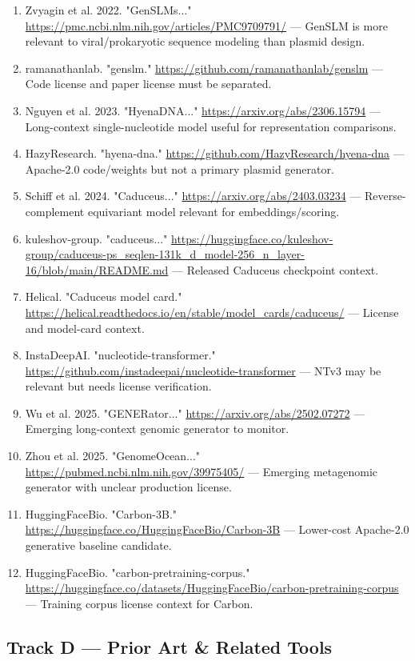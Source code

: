 \documentclass[11pt]{report}
\begin{document}
\begin{enumerate}
\item Zvyagin et al. 2022. "GenSLMs..." \url{https://pmc.ncbi.nlm.nih.gov/articles/PMC9709791/} — GenSLM is more relevant to viral/prokaryotic sequence modeling than plasmid design.
\item ramanathanlab. "genslm." \url{https://github.com/ramanathanlab/genslm} — Code license and paper license must be separated.
\item Nguyen et al. 2023. "HyenaDNA..." \url{https://arxiv.org/abs/2306.15794} — Long-context single-nucleotide model useful for representation comparisons.
\item HazyResearch. "hyena-dna." \url{https://github.com/HazyResearch/hyena-dna} — Apache-2.0 code/weights but not a primary plasmid generator.
\item Schiff et al. 2024. "Caduceus..." \url{https://arxiv.org/abs/2403.03234} — Reverse-complement equivariant model relevant for embeddings/scoring.
\item kuleshov-group. "caduceus..." \url{https://huggingface.co/kuleshov-group/caduceus-ps_seqlen-131k_d_model-256_n_layer-16/blob/main/README.md} — Released Caduceus checkpoint context.
\item Helical. "Caduceus model card." \url{https://helical.readthedocs.io/en/stable/model_cards/caduceus/} — License and model-card context.
\item InstaDeepAI. "nucleotide-transformer." \url{https://github.com/instadeepai/nucleotide-transformer} — NTv3 may be relevant but needs license verification.
\item Wu et al. 2025. "GENERator..." \url{https://arxiv.org/abs/2502.07272} — Emerging long-context genomic generator to monitor.
\item Zhou et al. 2025. "GenomeOcean..." \url{https://pubmed.ncbi.nlm.nih.gov/39975405/} — Emerging metagenomic generator with unclear production license.
\item HuggingFaceBio. "Carbon-3B." \url{https://huggingface.co/HuggingFaceBio/Carbon-3B} — Lower-cost Apache-2.0 generative baseline candidate.
\item HuggingFaceBio. "carbon-pretraining-corpus." \url{https://huggingface.co/datasets/HuggingFaceBio/carbon-pretraining-corpus} — Training corpus license context for Carbon.
\end{enumerate}

\subsection{Track D — Prior Art \& Related Tools}
\end{document}
